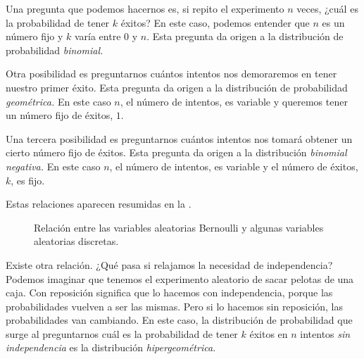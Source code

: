Una pregunta que podemos hacernos es, si repito el experimento \(n\) veces, ¿cuál es la probabilidad de tener \(k\) éxitos? En este caso, podemos entender que \(n\) es un número fijo y \(k\) varía entre \(0\) y \(n\). Esta pregunta da origen a la distribución de probabilidad \emph{binomial.}

Otra posibilidad es preguntarnos cuántos intentos nos demoraremos en tener nuestro primer éxito. Esta pregunta da origen a la distribución de probabilidad \emph{geométrica.} En este caso \(n\), el número de intentos, es variable y queremos tener un número fijo de éxitos, \(1\).

Una tercera posibilidad es preguntarnos cuántos intentos nos tomará  obtener un cierto número fijo de éxitos. Esta pregunta da origen a la distribución \emph{binomial negativa.} En este caso \(n\), el número de intentos, es variable y el número de éxitos, \(k\), es fijo.

Estas relaciones aparecen resumidas en la .

\begin{figure}
\caption{Relación entre las variables aleatorias Bernoulli y algunas variables aleatorias discretas.}
\end{figure}

Existe otra relación. ¿Qué pasa si relajamos la necesidad de independencia? Podemos imaginar que tenemos el experimento aleatorio de sacar pelotas de una caja. Con reposición significa que lo hacemos con independencia, porque las probabilidades vuelven a ser las mismas. Pero si lo hacemos sin reposición, las probabilidades van cambiando. En este caso, la distribución de probabilidad que surge al preguntarnos cuál es la probabilidad de tener \(k\) éxitos en \(n\) intentos \emph{sin independencia} es la distribución \emph{hipergeométrica.}

